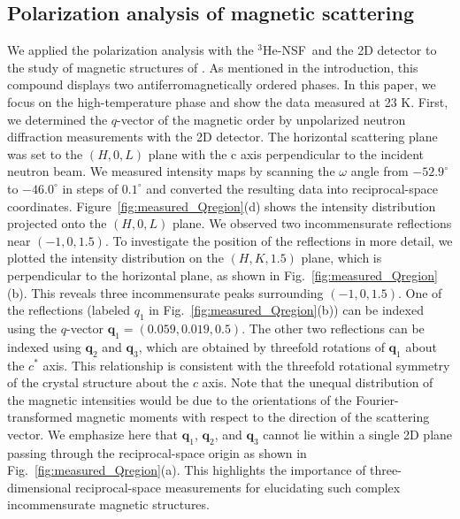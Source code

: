 \documentclass[%
 reprint,
superscriptaddress,
 amsmath,amssymb,
 aps,
floatfix,
]{revtex4-2}
\newcommand{\Hensf}{$^3$He-NSF}
\begin{document}
\subsection{Polarization analysis of magnetic scattering}
We applied the polarization analysis with the \Hensf~and the 2D detector to the study of magnetic structures of .
As mentioned in the introduction, this compound displays two antiferromagnetically ordered phases.
In this paper, we focus on the high-temperature phase and show the data measured at 23 K.
First, we determined the $q$-vector of the magnetic order by unpolarized neutron diffraction measurements with the 2D detector.
The horizontal scattering plane was set to the $(H,0,L)$ plane with the c axis perpendicular to the incident neutron beam.
We measured intensity maps by scanning the $\omega$ angle from $-52.9^\circ$ to $-46.0^\circ$ in steps of $0.1^\circ$ and converted the resulting data into reciprocal-space coordinates.
Figure~\ref{fig:measured_Qregion}(d) shows the intensity distribution projected onto the $(H,0,L)$ plane.
We observed two incommensurate reflections near $(-1,0,1.5)$.
To investigate the position of the reflections in more detail, we plotted the intensity distribution on the $(H,K,1.5)$ plane, which is perpendicular to the horizontal plane, as shown in Fig.~\ref{fig:measured_Qregion}(b).
This reveals three incommensurate peaks surrounding $(-1,0,1.5)$.
One of the reflections (labeled $q_1$ in Fig.~\ref{fig:measured_Qregion}(b)) can be indexed using the $q$-vector $\boldsymbol{q}_1 = (0.059, 0.019, 0.5)$.
The other two reflections can be indexed using $\boldsymbol{q}_2$ and $\boldsymbol{q}_3$, which are obtained by threefold rotations of $\boldsymbol{q}_1$ about the $c^*$ axis.
This relationship is consistent with the threefold rotational symmetry of the crystal structure about the $c$ axis.
Note that the unequal distribution of the magnetic intensities would be due to the orientations of the Fourier-transformed magnetic moments with respect to the direction of the scattering vector.
We emphasize here that $\boldsymbol{q}_1$, $\boldsymbol{q}_2$, and $\boldsymbol{q}_3$ cannot lie within a single 2D plane passing through the reciprocal-space origin as shown in Fig.~\ref{fig:measured_Qregion}(a).
This highlights the importance of three-dimensional reciprocal-space measurements for elucidating such complex incommensurate magnetic structures. %
\end{document}
